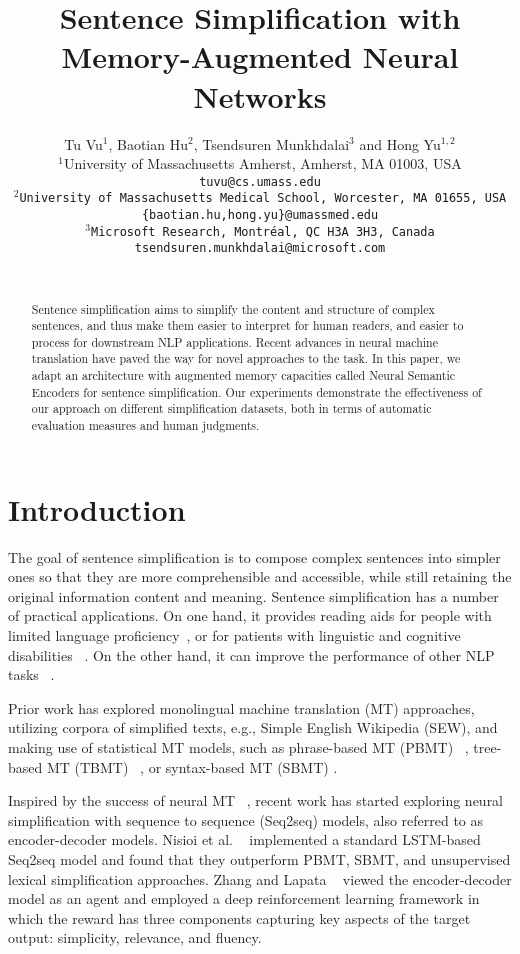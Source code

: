 \documentclass[11pt,a4paper]{article}
\title{Sentence Simplification with Memory-Augmented Neural Networks}
\author{Tu Vu$^{1}$, Baotian Hu$^{2}$, Tsendsuren Munkhdalai$^{3}$ and Hong Yu$^{1,2}$ \\
  $^{1}$University of Massachusetts Amherst, Amherst, MA 01003, USA\\
  \tt tuvu@cs.umass.edu\\
  $^{2}$University of Massachusetts Medical School, Worcester, MA 01655, USA\\
  \tt \{baotian.hu,hong.yu\}@umassmed.edu\\
  $^{3}$Microsoft Research, Montr\'eal, QC H3A 3H3, Canada\\
  \tt tsendsuren.munkhdalai@microsoft.com\\ \\}
\date{}
\begin{document}
\maketitle
\begin{abstract}
  Sentence simplification aims to simplify the content and structure of complex sentences, and thus make them easier to interpret for human readers, and easier to process for downstream NLP applications. Recent advances in neural machine translation have paved the way for novel approaches to the task. In this paper, we adapt an architecture with augmented memory capacities called Neural Semantic Encoders \cite{Munkhdalai:17a} for sentence simplification. Our experiments demonstrate the effectiveness of our approach on different simplification datasets, both in terms of automatic evaluation measures and human judgments.
\end{abstract}

\section{Introduction}
The goal of sentence simplification is to compose complex sentences into simpler ones so that they are more comprehensible and accessible, while still retaining the original information content and meaning. Sentence simplification has a number of practical applications.  On one hand, it provides reading aids for people with limited language proficiency~\cite{Watanabe:09,Siddharthan:03}, or for patients with linguistic and cognitive disabilities ~\cite{Carroll:99}. On the other hand, it can improve the performance of other NLP tasks ~\cite{Chandrasekar:96, Knight:00,Klebanov:04}.

Prior work has explored monolingual machine translation (MT) approaches, 
utilizing corpora of simplified texts, e.g., Simple English Wikipedia (SEW), and making use of statistical MT models, such as phrase-based MT (PBMT) ~\cite{Stajner:15,Coster:11,Wubben:12}, tree-based MT (TBMT) ~\cite{Zhu:10,Woodsend:11}, or syntax-based MT (SBMT) \cite{Xu:16}.

Inspired by the success of neural MT ~\cite{Sutskever:14,Cho:14}, recent work has started exploring neural simplification with sequence to sequence (Seq2seq) models, also referred to as encoder-decoder models.  Nisioi et al. ~ implemented a standard LSTM-based Seq2seq model and found that they outperform PBMT, SBMT, and unsupervised lexical simplification approaches. Zhang and Lapata ~\cite{Zhang:17} viewed the encoder-decoder model as an agent and employed a deep reinforcement learning framework in which the reward has three components capturing key aspects of the target output: simplicity, relevance, and fluency. 
\end{document}
